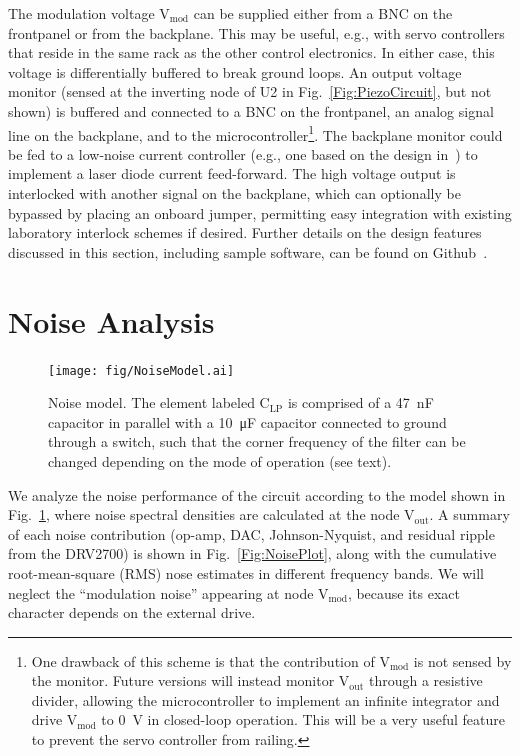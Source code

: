\documentclass[aip,rsi,reprint]{revtex4-1} %
\begin{document}
The modulation voltage $\text{V}_\text{mod}$ can be supplied either from a BNC on the frontpanel or from the backplane.
This may be useful, e.g., with servo controllers that reside in the same rack as the other control electronics.
In either case, this voltage is differentially buffered to break ground loops.
An output voltage monitor (sensed at the inverting node of U2 in Fig.~\ref{Fig:PiezoCircuit}, but not shown) is buffered and connected to a BNC on the frontpanel, an analog signal line on the backplane, and to the microcontroller\footnote{One drawback of this scheme is that the contribution of $\text{V}_\text{mod}$ is not sensed by the monitor. Future versions will instead monitor $\text{V}_\text{out}$ through a resistive divider, allowing the microcontroller to implement an infinite integrator and drive $\text{V}_\text{mod}$ to \SI{0}{\volt} in closed-loop operation. This will be a very useful feature to prevent the servo controller from railing.}.
The backplane monitor could be fed to a low-noise current controller (e.g., one based on the design in~\cite{Erickson2008a}) to implement a laser diode current feed-forward.
The high voltage output is interlocked with another signal on the backplane, which can optionally be bypassed by placing an onboard jumper, permitting easy integration with existing laboratory interlock schemes if desired.
Further details on the design features discussed in this section, including sample software, can be found on Github~\cite{DesignFiles}.

\section{Noise Analysis}
\label{Sec:NoiseAnalysis}

\begin{figure}[t]
\texttt{[image: fig/NoiseModel.ai]}
\caption{Noise model. The element labeled $\text{C}_\text{LP}$ is comprised of a \SI{47}{\nano\farad} capacitor in parallel with a \SI{10}{\micro\farad} capacitor connected to ground through a switch, such that the corner frequency of the filter can be changed depending on the mode of operation  (see text). %
\label{Fig:NoiseModel}}
\end{figure}

We analyze the noise performance of the circuit according to the model shown in Fig.~\ref{Fig:NoiseModel}, where noise spectral densities are calculated at the node $\text{V}_\text{out}$.
A summary of each noise contribution (op-amp, DAC, Johnson-Nyquist, and residual ripple from the DRV2700) is shown in Fig.~\ref{Fig:NoisePlot}, along with the cumulative root-mean-square (RMS) nose estimates in different frequency bands.
We will neglect the ``modulation noise'' appearing at node $\text{V}_\text{mod}$, because its exact character depends on the external drive.
\end{document}
